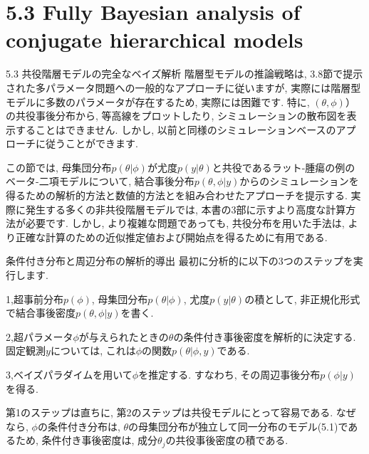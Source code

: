 \documentclass[10pt,dvipdfmx,a4]{beamer}
\begin{document}
\section{5.3 Fully Bayesian analysis of conjugate hierarchical models}
\begin{frame}{5.3 共役階層モデルの完全なベイズ解析}
階層型モデルの推論戦略は, 3.8節で提示された多パラメータ問題への一般的なアプローチに従いますが, 実際には階層型モデルに多数のパラメータが存在するため, 実際には困難です.
特に, $(\theta,\phi)$）の共役事後分布から, 等高線をプロットしたり, シミュレーションの散布図を表示することはできません.
しかし, 以前と同様のシミュレーションベースのアプローチに従うことができます.

この節では, 母集団分布$p(\theta|\phi)$が尤度$p(y|\theta)$と共役であるラット-腫瘍の例のベータ-二項モデルについて, 結合事後分布$p(\theta,\phi|y)$からのシミュレーションを得るための解析的方法と数値的方法とを組み合わせたアプローチを提示する.
実際に発生する多くの非共役階層モデルでは, 本書の3部に示すより高度な計算方法が必要です.
しかし, より複雑な問題であっても, 共役分布を用いた手法は, より正確な計算のための近似推定値および開始点を得るために有用である.
\end{frame}


\begin{frame}{条件付き分布と周辺分布の解析的導出}
最初に分析的に以下の3つのステップを実行します.

1,超事前分布$p(\phi)$, 母集団分布$p(\theta|\phi)$, 尤度$p(y|\theta)$の積として, 非正規化形式で結合事後密度$p(\theta,\phi|y)$を書く.

2,超パラメータ$\phi$が与えられたときの$\theta$の条件付き事後密度を解析的に決定する.
固定観測$y$については, これは$\phi$の関数$p(\theta|\phi, y)$である.

3,ベイズパラダイムを用いて$\phi$を推定する.
すなわち, その周辺事後分布$p(\phi|y)$を得る.

第1のステップは直ちに, 第2のステップは共役モデルにとって容易である.
なぜなら, $\phi$の条件付き分布は, $\theta$の母集団分布が独立して同一分布のモデル(5.1)であるため, 条件付き事後密度は, 成分$\theta_j$の共役事後密度の積である.
\end{frame}

\end{document}
